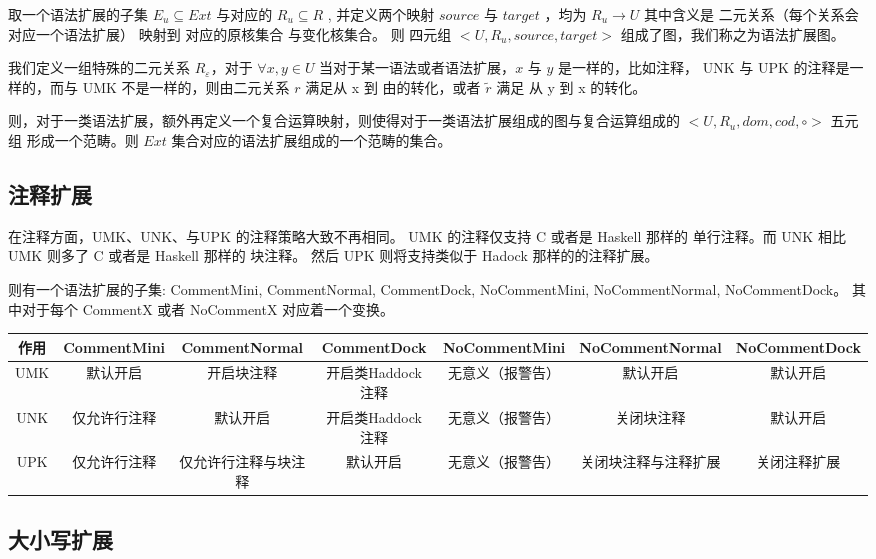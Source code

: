 \documentclass{ctexart}
\begin{document}
取一个语法扩展的子集 $E_u \subseteq Ext$ 与对应的 $R_u \subseteq R$ , 并定义两个映射 $source$ 与 $target$ ，均为
$ R_u \rightarrow U$ 其中含义是 二元关系（每个关系会对应一个语法扩展） 映射到 对应的原核集合 与变化核集合。
则 四元组 $<U,R_u,source,target>$ 组成了图，我们称之为语法扩展图。

我们定义一组特殊的二元关系 $R_\varepsilon$，对于 $ \forall x,y \in U$ 当对于某一语法或者语法扩展，$x$ 与 $y$ 是一样的，比如注释，
UNK 与 UPK 的注释是一样的，而与 UMK 不是一样的，则由二元关系 $r$ 满足从 x 到 由的转化，或者 $\widetilde{r}$ 满足 从 y 到 x 的转化。

则，对于一类语法扩展，额外再定义一个复合运算映射，则使得对于一类语法扩展组成的图与复合运算组成的 $<U,R_u,dom,cod,\circ>$ 五元组
形成一个范畴。则 $Ext$ 集合对应的语法扩展组成的一个范畴的集合。


\subsection{注释扩展}
\label{sec:langexte:comment}

在注释方面，UMK、UNK、与UPK 的注释策略大致不再相同。 UMK 的注释仅支持 C 或者是 Haskell 那样的 单行注释。而 UNK 相比UMK 则多了
C 或者是 Haskell 那样的 块注释。 然后 UPK 则将支持类似于 Hadock 那样的的注释扩展。

则有一个语法扩展的子集: CommentMini, CommentNormal, CommentDock, NoCommentMini, NoCommentNormal, NoCommentDock。
其中对于每个 CommentX 或者 NoCommentX 对应着一个变换。

\begin{tabular}{|c|c|c|c|c|c|c|}
  \hline 作用 & CommentMini & CommentNormal & CommentDock & NoCommentMini & NoCommentNormal & NoCommentDock \\
  \hline UMK & 默认开启 & 开启块注释 & 开启类Haddock注释 & 无意义（报警告）& 默认开启 & 默认开启 \\ 
  \hline UNK & 仅允许行注释 & 默认开启 & 开启类Haddock注释 & 无意义（报警告） & 关闭块注释 & 默认开启 \\
  \hline UPK & 仅允许行注释 & 仅允许行注释与块注释 & 默认开启 & 无意义（报警告） & 关闭块注释与注释扩展 & 关闭注释扩展 \\
  \hline 
\end{tabular}

\subsection{大小写扩展}
\label{sec:langexte:lettercase}
\end{document}
